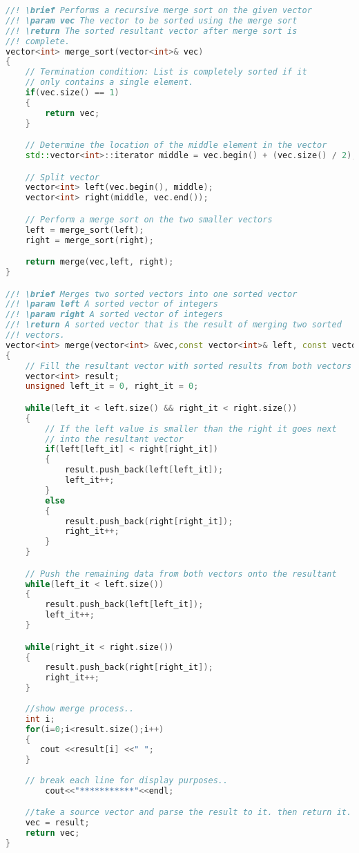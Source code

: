 \documentclass[main]{subfiles}
\begin{document}
\scriptsize
\begin{lstlisting}[language=C++]
//! \brief Performs a recursive merge sort on the given vector
//! \param vec The vector to be sorted using the merge sort
//! \return The sorted resultant vector after merge sort is
//! complete.
vector<int> merge_sort(vector<int>& vec)
{
    // Termination condition: List is completely sorted if it
    // only contains a single element.
    if(vec.size() == 1)
    {
        return vec;
    }

    // Determine the location of the middle element in the vector
    std::vector<int>::iterator middle = vec.begin() + (vec.size() / 2);

	// Split vector
    vector<int> left(vec.begin(), middle);
    vector<int> right(middle, vec.end());

    // Perform a merge sort on the two smaller vectors
    left = merge_sort(left);
    right = merge_sort(right);

    return merge(vec,left, right);
}

//! \brief Merges two sorted vectors into one sorted vector
//! \param left A sorted vector of integers
//! \param right A sorted vector of integers
//! \return A sorted vector that is the result of merging two sorted
//! vectors.
vector<int> merge(vector<int> &vec,const vector<int>& left, const vector<int>& right)
{
    // Fill the resultant vector with sorted results from both vectors
    vector<int> result;
    unsigned left_it = 0, right_it = 0;

    while(left_it < left.size() && right_it < right.size())
    {
        // If the left value is smaller than the right it goes next
        // into the resultant vector
        if(left[left_it] < right[right_it])
        {
            result.push_back(left[left_it]);
            left_it++;
        }
        else
        {
            result.push_back(right[right_it]);
            right_it++;
        }
    }

    // Push the remaining data from both vectors onto the resultant
    while(left_it < left.size())
    {
        result.push_back(left[left_it]);
        left_it++;
    }

    while(right_it < right.size())
    {
        result.push_back(right[right_it]);
        right_it++;
    }
    
    //show merge process..
    int i;
    for(i=0;i<result.size();i++)
    {                                
	   cout <<result[i] <<" ";
    }
    
    // break each line for display purposes..
        cout<<"***********"<<endl; 

    //take a source vector and parse the result to it. then return it.  
	vec = result;				
	return vec;
}
\end{lstlisting}
\end{document}
